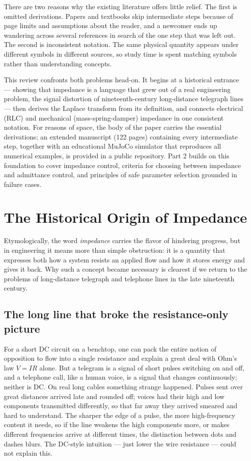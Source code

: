There are two reasons why the existing literature offers little relief.
The first is omitted derivations.
Papers and textbooks skip intermediate steps because of page limits and
assumptions about the reader, and a newcomer ends up wandering across several
references in search of the one step that was left out.
The second is inconsistent notation.
The same physical quantity appears under different symbols in different
sources, so study time is spent matching symbols rather than understanding
concepts.

This review confronts both problems head-on.
It begins at a historical entrance --- showing that impedance is a language
that grew out of a real engineering problem, the signal distortion of
nineteenth-century long-distance telegraph lines --- then derives the Laplace
transform from its definition, and connects electrical (RLC) and mechanical
(mass-spring-damper) impedance in one consistent notation.
For reasons of space, the body of the paper carries the essential
derivations; an extended manuscript (122 pages) containing every intermediate
step, together with an educational MuJoCo simulator that reproduces all
numerical examples, is provided in a public repository.
Part 2 builds on this foundation to cover impedance control, criteria for
choosing between impedance and admittance control, and principles of safe
parameter selection grounded in failure cases.

\section{The Historical Origin of Impedance}\label{sec:u5-history}

Etymologically, the word \emph{impedance} carries the flavor of hindering
progress, but in engineering it means more than simple obstruction: it is a
quantity that expresses both how a system resists an applied flow and how it
stores energy and gives it back.
Why such a concept became necessary is clearest if we return to the problems
of long-distance telegraph and telephone lines in the late nineteenth
century.

\subsection{The long line that broke the resistance-only picture}

For a short DC circuit on a benchtop, one can pack the entire notion of
opposition to flow into a single resistance and explain a great deal with
Ohm's law $V=IR$ alone.
But a telegram is a signal of short pulses switching on and off, and a
telephone call, like a human voice, is a signal that changes continuously;
neither is DC.
On real long cables something strange happened.
Pulses sent over great distances arrived late and rounded off; voices had
their high and low components transmitted differently, so that far away
they arrived smeared and hard to understand.
The sharper the edge of a pulse, the more high-frequency content it needs,
so if the line weakens the high components more, or makes different
frequencies arrive at different times, the distinction between dots and
dashes blurs.
The DC-style intuition --- just lower the wire resistance --- could not
explain this.

